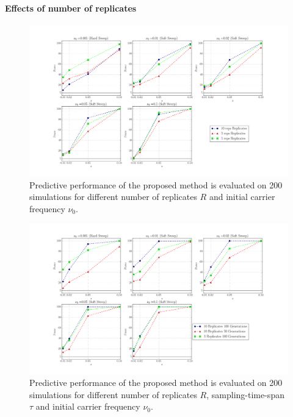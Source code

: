 \documentclass[11pt]{article}
\begin{document}
\paragraph{Effects of number of replicates}
\begin{figure}
	\centering
\includegraphics[trim=2.2in 0 2.2in 0, clip,width=\textwidth]{powerReplicate}
\caption{Predictive performance of the proposed method is evaluated on 200 
simulations for different number of replicates $R$ and initial carrier 
frequency $\nu_0$.} \label{fig:powerr}
\end{figure}
\begin{figure}
	\centering
\includegraphics[trim=2.2in 0 2.2in 0, 
clip,width=\textwidth]{powerReplicateTime}
	\caption{Predictive performance of the proposed method is evaluated on 200 
			simulations for different number of replicates $R$, 
			sampling-time-span $\tau$ and initial carrier 
			frequency $\nu_0$.} \label{fig:powerrt}
\end{figure}
\end{document}

